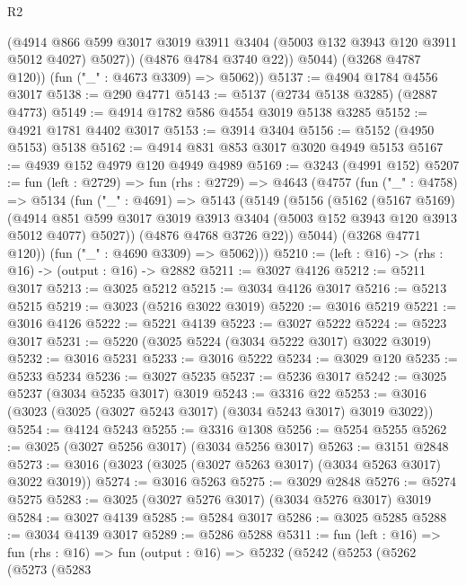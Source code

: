\begin{lexlean}{R2}
\begin{coremodule}
              (@4914
                @866
                @599
                @3017
                @3019
                @3911
                @3404
                (@5003 @132 @3943 @120 @3911 @5012 @4027)
                @5027))
            (@4876 @4784 @3740 @22))
          @5044)
        (@3268 @4787 @120))
      (fun ("_" : @4673 @3309) => @5062))
@5137 := @4904 @1784 @4556 @3017
@5138 := @290 @4771
@5143 := @5137 (@2734 @5138 @3285) (@2887 @4773)
@5149 := @4914 @1782 @586 @4554 @3019 @5138 @3285
@5152 := @4921 @1781 @4402 @3017
@5153 := @3914 @3404
@5156 := @5152 (@4950 @5153) @5138
@5162 := @4914 @831 @853 @3017 @3020 @4949 @5153
@5167 := @4939 @152 @4979 @120 @4949 @4989
@5169 := @3243 (@4991 @152)
@5207 := fun (left : @2729) =>
  fun (rhs : @2729) =>
  @4643
    (@4757
      (fun ("_" : @4758) =>
      @5134
        (fun ("_" : @4691) =>
        @5143
          (@5149
            (@5156
              (@5162
                (@5167 @5169)
                (@4914
                  @851
                  @599
                  @3017
                  @3019
                  @3913
                  @3404
                  (@5003 @152 @3943 @120 @3913 @5012 @4077)
                  @5027))
              (@4876 @4768 @3726 @22))
            @5044)
          (@3268 @4771 @120))
        (fun ("_" : @4690 @3309) => @5062)))
@5210 := (left : @16) -> (rhs : @16) -> (output : @16) -> @2882
@5211 := @3027 @4126
@5212 := @5211 @3017
@5213 := @3025 @5212
@5215 := @3034 @4126 @3017
@5216 := @5213 @5215
@5219 := @3023 (@5216 @3022 @3019)
@5220 := @3016 @5219
@5221 := @3016 @4126
@5222 := @5221 @4139
@5223 := @3027 @5222
@5224 := @5223 @3017
@5231 := @5220 (@3025 @5224 (@3034 @5222 @3017) @3022 @3019)
@5232 := @3016 @5231
@5233 := @3016 @5222
@5234 := @3029 @120
@5235 := @5233 @5234
@5236 := @3027 @5235
@5237 := @5236 @3017
@5242 := @3025 @5237 (@3034 @5235 @3017) @3019
@5243 := @3316 @22
@5253 := @3016 (@3023 (@3025 (@3027 @5243 @3017) (@3034 @5243 @3017) @3019 @3022))
@5254 := @4124 @5243
@5255 := @3316 @1308
@5256 := @5254 @5255
@5262 := @3025 (@3027 @5256 @3017) (@3034 @5256 @3017)
@5263 := @3151 @2848
@5273 := @3016 (@3023 (@3025 (@3027 @5263 @3017) (@3034 @5263 @3017) @3022 @3019))
@5274 := @3016 @5263
@5275 := @3029 @2848
@5276 := @5274 @5275
@5283 := @3025 (@3027 @5276 @3017) (@3034 @5276 @3017) @3019
@5284 := @3027 @4139
@5285 := @5284 @3017
@5286 := @3025 @5285
@5288 := @3034 @4139 @3017
@5289 := @5286 @5288
@5311 := fun (left : @16) =>
  fun (rhs : @16) =>
  fun (output : @16) =>
  @5232
    (@5242
      (@5253
        (@5262
          (@5273
            (@5283

\end{coremodule}
\end{lexlean}
